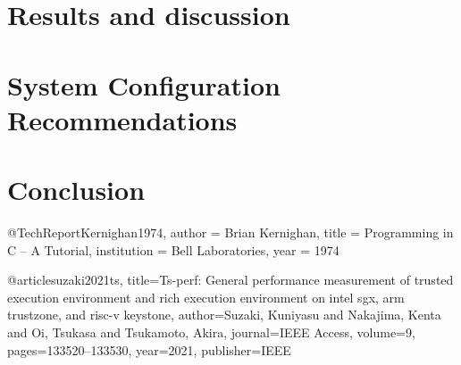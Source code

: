 \documentclass[english, version-2020-11]{uzl-thesis}
\begin{document}
\chapter{Results and discussion}


\chapter{System Configuration Recommendations}


\chapter{Conclusion}
%

\begin{bibtex-entries}
@TechReport{Kernighan1974,
author = {Brian Kernighan},
title = {Programming in C – A Tutorial},
institution = {Bell Laboratories},
year = {1974}
}

@article{suzaki2021ts,
  title={Ts-perf: General performance measurement of trusted execution environment and rich execution environment on intel sgx, arm trustzone, and risc-v keystone},
  author={Suzaki, Kuniyasu and Nakajima, Kenta and Oi, Tsukasa and Tsukamoto, Akira},
  journal={IEEE Access},
  volume={9},
  pages={133520--133530},
  year={2021},
  publisher={IEEE}
}

\end{bibtex-entries}
\end{document}
